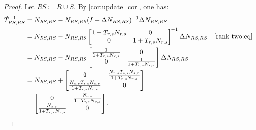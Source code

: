 \begin{proof}
Let \(RS \coloneqq R \cup S\).
By \cref{cor:update_cor}, one has:
\begin{align*}
  \tilde{T}^{-1}_{RS, RS} &= N_{RS, RS} - N_{RS, RS} (I + \Delta N_{RS, RS})^{-1} \Delta N_{RS, RS} & \\
                     &= N_{RS, RS} - N_{RS, RS} \begin{bmatrix} 1 + T_{r, s} N_{r, s} & 0 \\ 0 & 1 + T_{r, s} N_{r, s} \end{bmatrix}^{-1} \Delta N_{RS, RS} & \eqref{rank-two:eq} \\
                     &= N_{RS, RS} - N_{RS, RS} \begin{bmatrix} \frac{1}{1 + T_{r, s} N_{r, s}} & 0 \\ 0 & \frac{1}{1 + T_{r, s} N_{r, s}} \end{bmatrix} \Delta N_{RS, RS} &\\
                     &= N_{RS, RS} + \begin{bmatrix} 0 & \frac{N_{r, s}T_{s, r}N_{s, r}}{1 + T_{r, s} N_{r, s}} \\ \frac{N_{s, r}T_{r, s}N_{s, r}}{1 + T_{r, s} N_{r, s}} & 0 \end{bmatrix} & \\
                     &= \begin{bmatrix} 0 & \frac{N_{r, s}}{1 + T_{r, s} N_{r, s}} \\ \frac{N_{s, r}}{1 + T_{r, s} N_{r, s}} & 0 \end{bmatrix}. & \qedhere
\end{align*}
\end{proof}


